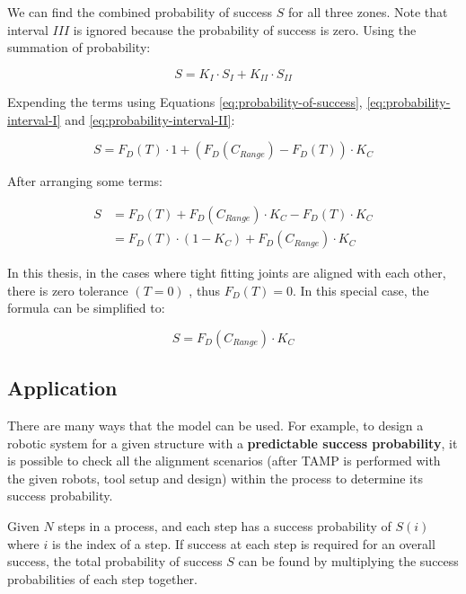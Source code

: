 

We can find the combined probability of success $S$ for all three zones. Note that interval $III$ is ignored because the probability of success is zero. Using the summation of probability:

\begin{equation} \label{eq:probability-of-three-intervals}
    S = K_I \cdot S_I + K_{II} \cdot S_{II}   
\end{equation}

Expending the terms using Equations \ref{eq:probability-of-success}, \ref{eq:probability-interval-I} and \ref{eq:probability-interval-II}:

\begin{equation} \label{eq:probability-expanded}
    S = F_D(T) \cdot 1 + (F_D (C_{Range}) - F_D(T)) \cdot K_C
\end{equation}

After arranging some terms:

\begin{align} \label{eq:probability-expanded-rearranged}
    S &= F_D(T) + F_D (C_{Range}) \cdot K_C - F_D(T) \cdot K_C \nonumber \\
      &= F_D(T) \cdot (1 - K_C) + F_D(C_{Range}) \cdot K_C 
\end{align}

In this thesis, in the cases where tight fitting joints are aligned with each other, there is zero tolerance $(T = 0)$ , thus $F_D(T) = 0$. In this special case, the formula can be simplified to:

\begin{equation} \label{eq:probability-when-zero-tolerance}
    S = F_D(C_{Range}) \cdot K_C 
\end{equation}

\subsection{Application}
\label{subsection:new-hypo-model-application}

There are many ways that the model can be used. For example, to design a robotic system for a given structure with a \textbf{predictable success probability}, it is possible to check all the alignment scenarios (after TAMP is performed with the given robots, tool setup and design) within the process to determine its success probability. 

Given $N$ steps in a process, and each step has a success probability of $S(i)$ where $i$ is the index of a step. If success at each step is required for an overall success, the total probability of success $S$ can be found by multiplying the success probabilities of each step together.

